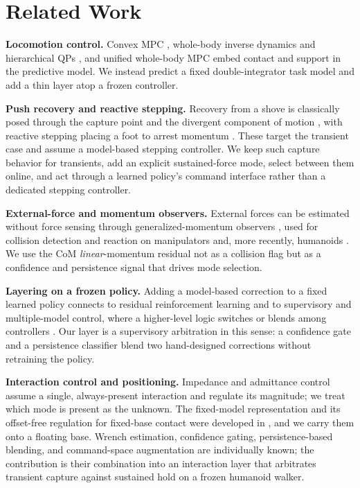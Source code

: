 \documentclass[journal]{IEEEtran}
\begin{document}
\section{Related Work}
\label{sec:related}

\textbf{Locomotion control.} Convex MPC \cite{r2,r3,r13}, whole-body inverse dynamics and hierarchical QPs \cite{r4,r5,r7,r9}, and unified whole-body MPC \cite{r10} embed contact and support in the predictive model. We instead predict a fixed double-integrator task model and add a thin layer atop a frozen controller.

\textbf{Push recovery and reactive stepping.} Recovery from a shove is classically posed through the capture point and the divergent component of motion \cite{r20,r21}, with reactive stepping placing a foot to arrest momentum \cite{r22}. These target the transient case and assume a model-based stepping controller. We keep such capture behavior for transients, add an explicit sustained-force mode, select between them online, and act through a learned policy's command interface rather than a dedicated stepping controller.

\textbf{External-force and momentum observers.} External forces can be estimated without force sensing through generalized-momentum observers \cite{r14,r15}, used for collision detection and reaction on manipulators and, more recently, humanoids \cite{r25}. We use the CoM \emph{linear}-momentum residual not as a collision flag but as a confidence and persistence signal that drives mode selection.

\textbf{Layering on a frozen policy.} Adding a model-based correction to a fixed learned policy connects to residual reinforcement learning \cite{r23} and to supervisory and multiple-model control, where a higher-level logic switches or blends among controllers \cite{r24}. Our layer is a supervisory arbitration in this sense: a confidence gate and a persistence classifier blend two hand-designed corrections without retraining the policy.

\textbf{Interaction control and positioning.} Impedance and admittance control \cite{r6,r11,r12} assume a single, always-present interaction and regulate its magnitude; we treat which mode is present as the unknown. The fixed-model representation and its offset-free regulation for fixed-base contact were developed in \cite{r1}, and we carry them onto a floating base. Wrench estimation, confidence gating, persistence-based blending, and command-space augmentation are individually known; the contribution is their combination into an interaction layer that arbitrates transient capture against sustained hold on a frozen humanoid walker.
\end{document}
